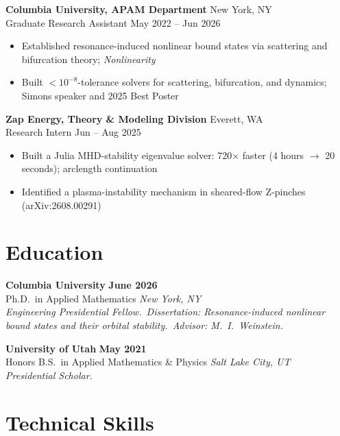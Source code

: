 \documentclass[10pt]{article}
\begin{document}
\textbf{Columbia University, APAM Department} \hfill New York, NY\\[1pt]
{\color{accent}Graduate Research Assistant} \hfill May 2022 -- Jun 2026
\begin{itemize}
\item Established resonance-induced nonlinear bound states via scattering and bifurcation theory; \textit{Nonlinearity}
\item Built $<10^{-8}$-tolerance solvers for scattering, bifurcation, and dynamics; Simons speaker and 2025 Best Poster
\end{itemize}

\vspace{2pt}
\textbf{Zap Energy, Theory \& Modeling Division} \hfill Everett, WA\\[1pt]
{\color{accent}Research Intern} \hfill Jun -- Aug 2025
\begin{itemize}
\item Built a Julia MHD-stability eigenvalue solver: 720$\times$ faster (4 hours $\to$ 20 seconds); arclength continuation
\item Identified a plasma-instability mechanism in sheared-flow Z-pinches (arXiv:2608.00291)
\end{itemize}

\vspace{2pt}
\section*{Education}

\textbf{Columbia University} \hfill \textbf{June 2026}\\
Ph.D.\ in Applied Mathematics \hfill \textit{New York, NY}\\
{\small \textit{Engineering Presidential Fellow.\ Dissertation: Resonance-induced nonlinear bound states and their orbital stability.\ Advisor: M.\ I.\ Weinstein.}}

\vspace{1pt}

\textbf{University of Utah} \hfill \textbf{May 2021}\\
Honors B.S.\ in Applied Mathematics \& Physics \hfill \textit{Salt Lake City, UT}\\
{\small \textit{Presidential Scholar.}}
\vspace{2pt}
\section*{Technical Skills}
\end{document}
